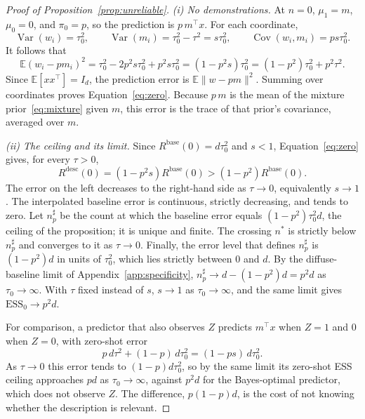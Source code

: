 \documentclass{article}
\theoremstyle{definition}
\newcommand{\ess}{\mathrm{ESS}}
\newcommand{\E}{\mathbb{E}}
\begin{document}
\begin{proof}[Proof of Proposition~\ref{prop:unreliable}]
\emph{(i) No demonstrations.}
At $n=0$, $\mu_1=m$, $\mu_0=0$, and $\pi_0=p$, so the prediction is $p\,m^\top x$. For each coordinate,
\[
\operatorname{Var}(w_i)=\tau_0^2,\qquad
\operatorname{Var}(m_i)=\tau_0^2-\tau^2=s\tau_0^2,\qquad
\operatorname{Cov}(w_i,m_i)=ps\tau_0^2.
\]
It follows that
\[
\E(w_i-pm_i)^2
=\tau_0^2-2p^2s\tau_0^2+p^2s\tau_0^2
=(1-p^2s)\tau_0^2
=(1-p^2)\tau_0^2+p^2\tau^2.
\]
Since $\E[xx^\top]=I_d$, the prediction error is $\E\|w-pm\|^2$. Summing over coordinates proves Equation~\eqref{eq:zero}. Because $p\,m$ is the mean of the mixture prior~\eqref{eq:mixture} given $m$, this error is the trace of that prior's covariance, averaged over $m$.

\emph{(ii) The ceiling and its limit.}
Since $R^{\mathrm{base}}(0)=d\tau_0^2$ and $s<1$, Equation~\eqref{eq:zero} gives, for every $\tau>0$,
\[
R^{\mathrm{desc}}(0)
=(1-p^2s)R^{\mathrm{base}}(0)
>(1-p^2)R^{\mathrm{base}}(0).
\]
The error on the left decreases to the right-hand side as $\tau\to0$, equivalently $s\to1$. The interpolated baseline error is continuous, strictly decreasing, and tends to zero. Let $n_p^{\sharp}$ be the count at which the baseline error equals $(1-p^2)\tau_0^2d$, the ceiling of the proposition; it is unique and finite. The crossing $n^*$ is strictly below $n_p^{\sharp}$ and converges to it as $\tau\to0$. Finally, the error level that defines $n_p^{\sharp}$ is $(1-p^2)d$ in units of $\tau_0^2$, which lies strictly between $0$ and $d$. By the diffuse-baseline limit of Appendix~\ref{app:specificity}, $n_p^{\sharp}\to d-(1-p^2)d=p^2d$ as $\tau_0\to\infty$. With $\tau$ fixed instead of $s$, $s\to1$ as $\tau_0\to\infty$, and the same limit gives $\ess_0\to p^2d$.

For comparison, a predictor that also observes $Z$ predicts $m^\top x$ when $Z=1$ and $0$ when $Z=0$, with zero-shot error
\[
p\,d\tau^2+(1-p)\,d\tau_0^2=(1-ps)\,d\tau_0^2.
\]
As $\tau\to0$ this error tends to $(1-p)d\tau_0^2$, so by the same limit its zero-shot ESS ceiling approaches $pd$ as $\tau_0\to\infty$, against $p^2d$ for the Bayes-optimal predictor, which does not observe $Z$. The difference, $p(1-p)d$, is the cost of not knowing whether the description is relevant.


\end{proof}
\end{document}
